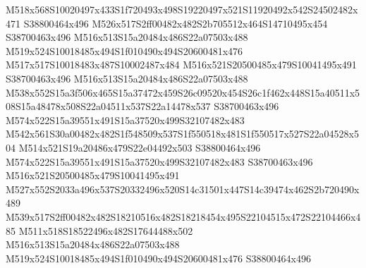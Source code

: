 \documentclass{article}
\begin{document}
\begin{multicols}{2}







M518x568S10020497x433S1f720493x498S19220497x521S11920492x542S24502482x471 S38800464x496 M526x517S2ff00482x482S2b705512x464S14710495x454 S38700463x496 M516x513S15a20484x486S22a07503x488 M519x524S10018485x494S1f010490x494S20600481x476 M517x517S10018483x487S10002487x484 M516x521S20500485x479S10041495x491 S38700463x496 M516x513S15a20484x486S22a07503x488 M538x552S15a3f506x465S15a37472x459S26c09520x454S26c1f462x448S15a40511x508S15a48478x508S22a04511x537S22a14478x537 S38700463x496 M574x522S15a39551x491S15a37520x499S32107482x483 M542x561S30a00482x482S1f548509x537S1f550518x481S1f550517x527S22a04528x504 M514x521S19a20486x479S22e04492x503 S38800464x496 M574x522S15a39551x491S15a37520x499S32107482x483 S38700463x496 M516x521S20500485x479S10041495x491 M527x552S2033a496x537S20332496x520S14c31501x447S14c39474x462S2b720490x489 M539x517S2ff00482x482S18210516x482S18218454x495S22104515x472S22104466x485 M511x518S18522496x482S17644488x502 M516x513S15a20484x486S22a07503x488 M519x524S10018485x494S1f010490x494S20600481x476 S38800464x496







\end{multicols}
\end{document}
